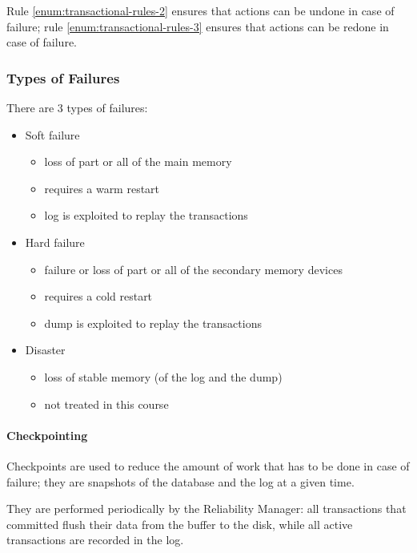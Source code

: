 \documentclass[english]{article}
\begin{document}
Rule \ref{enum:transactional-rules-2} ensures that actions can be undone in case of failure;
rule \ref{enum:transactional-rules-3} ensures that actions can be redone in case of failure.

\subsubsection{Types of Failures}

There are \(3\) types of failures:

\begin{itemize}
  \item Soft failure
        \begin{itemize}
          \item loss of part or all of the main memory
          \item requires a warm restart
          \item log is exploited to replay the transactions
        \end{itemize}
  \item Hard failure
        \begin{itemize}
          \item failure or loss of part or all of the secondary memory devices
          \item requires a cold restart
          \item dump is exploited to replay the transactions
        \end{itemize}
  \item Disaster
        \begin{itemize}
          \item loss of stable memory (of the log and the dump)
          \item not treated in this course
        \end{itemize}
\end{itemize}

\paragraph{Checkpointing}

Checkpoints are used to reduce the amount of work that has to be done in case of failure;
they are snapshots of the database and the log at a given time.

They are performed periodically by the Reliability Manager:
all transactions that committed flush their data from the buffer to the disk, while all active transactions are recorded in the log.
\end{document}
